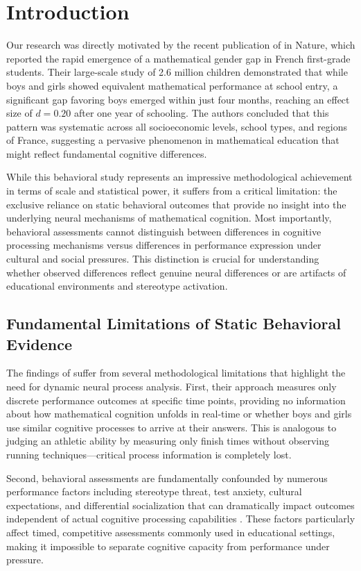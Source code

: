 \documentclass[pdflatex,reference]{sn-jnl}%
\theoremstyle{thmstyleone}%
\theoremstyle{thmstyletwo}%
\theoremstyle{thmstylethree}%
\begin{document}
\section{Introduction}\label{sec1}
Our research was directly motivated by the recent publication of \cite{martinot2025mathematical} in Nature, which reported the rapid emergence of a mathematical gender gap in French first-grade students. Their large-scale study of 2.6 million children demonstrated that while boys and girls showed equivalent mathematical performance at school entry, a significant gap favoring boys emerged within just four months, reaching an effect size of $d = 0.20$ after one year of schooling. The authors concluded that this pattern was systematic across all socioeconomic levels, school types, and regions of France, suggesting a pervasive phenomenon in mathematical education that might reflect fundamental cognitive differences.

While this behavioral study represents an impressive methodological achievement in terms of scale and statistical power, it suffers from a critical limitation: the exclusive reliance on static behavioral outcomes that provide no insight into the underlying neural mechanisms of mathematical cognition. Most importantly, behavioral assessments cannot distinguish between differences in cognitive processing mechanisms versus differences in performance expression under cultural and social pressures. This distinction is crucial for understanding whether observed differences reflect genuine neural differences or are artifacts of educational environments and stereotype activation.

\subsection{Fundamental Limitations of Static Behavioral Evidence}
The findings of \cite{martinot2025mathematical} suffer from several methodological limitations that highlight the need for dynamic neural process analysis. First, their approach measures only discrete performance outcomes at specific time points, providing no information about how mathematical cognition unfolds in real-time or whether boys and girls use similar cognitive processes to arrive at their answers. This is analogous to judging an athletic ability by measuring only finish times without observing running techniques—critical process information is completely lost.

Second, behavioral assessments are fundamentally confounded by numerous performance factors including stereotype threat, test anxiety, cultural expectations, and differential socialization that can dramatically impact outcomes independent of actual cognitive processing capabilities \cite{spencer1999stereotype,schmader2008threat}. These factors particularly affect timed, competitive assessments commonly used in educational settings, making it impossible to separate cognitive capacity from performance under pressure.
\end{document}

